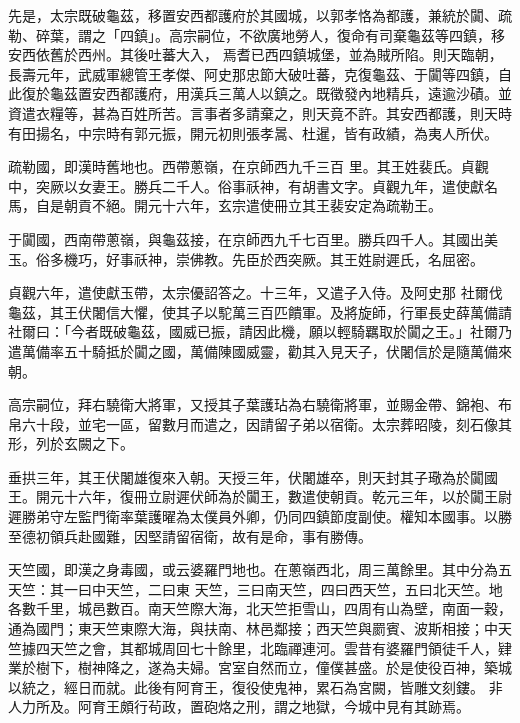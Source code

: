 \begin{pinyinscope}
 先是，太宗既破龜茲，移置安西都護府於其國城，以郭孝恪為都護，兼統於闐、疏勒、碎葉，謂之「四鎮」。高宗嗣位，不欲廣地勞人，復命有司棄龜茲等四鎮，移安西依舊於西州。其後吐蕃大入，
 焉耆已西四鎮城堡，並為賊所陷。則天臨朝，長壽元年，武威軍總管王孝傑、阿史那忠節大破吐蕃，克復龜茲、于闐等四鎮，自此復於龜茲置安西都護府，用漢兵三萬人以鎮之。既徵發內地精兵，遠逾沙磧。並資遣衣糧等，甚為百姓所苦。言事者多請棄之，則天竟不許。其安西都護，則天時有田揚名，中宗時有郭元振，開元初則張孝暠、杜暹，皆有政績，為夷人所伏。



 疏勒國，即漢時舊地也。西帶蔥嶺，在京師西九千三百
 里。其王姓裴氏。貞觀中，突厥以女妻王。勝兵二千人。俗事祅神，有胡書文字。貞觀九年，遣使獻名馬，自是朝貢不絕。開元十六年，玄宗遣使冊立其王裴安定為疏勒王。



 于闐國，西南帶蔥嶺，與龜茲接，在京師西九千七百里。勝兵四千人。其國出美玉。俗多機巧，好事祅神，崇佛教。先臣於西突厥。其王姓尉遲氏，名屈密。



 貞觀六年，遣使獻玉帶，太宗優詔答之。十三年，又遣子入侍。及阿史那
 社爾伐龜茲，其王伏闍信大懼，使其子以駝萬三百匹饋軍。及將旋師，行軍長史薛萬備請社爾曰：「今者既破龜茲，國威已振，請因此機，願以輕騎羈取於闐之王。」社爾乃遣萬備率五十騎抵於闐之國，萬備陳國威靈，勸其入見天子，伏闍信於是隨萬備來朝。



 高宗嗣位，拜右驍衛大將軍，又授其子葉護玷為右驍衛將軍，並賜金帶、錦袍、布帛六十段，並宅一區，留數月而遣之，因請留子弟以宿衛。太宗葬昭陵，刻石像其形，列於玄闕之下。



 垂拱三年，其王伏闍雄復來入朝。天授三年，伏闍雄卒，則天封其子璥為於闐國王。開元十六年，復冊立尉遲伏師為於闐王，數遣使朝貢。乾元三年，以於闐王尉遲勝弟守左監門衛率葉護曜為太僕員外卿，仍同四鎮節度副使。權知本國事。以勝至德初領兵赴國難，因堅請留宿衛，故有是命，事有勝傳。



 天竺國，即漢之身毒國，或云婆羅門地也。在蔥嶺西北，周三萬餘里。其中分為五天竺：其一曰中天竺，二曰東
 天竺，三曰南天竺，四曰西天竺，五曰北天竺。地各數千里，城邑數百。南天竺際大海，北天竺拒雪山，四周有山為壁，南面一穀，通為國門；東天竺東際大海，與扶南、林邑鄰接；西天竺與罽賓、波斯相接；中天竺據四天竺之會，其都城周回七十餘里，北臨禪連河。雲昔有婆羅門領徒千人，肄業於樹下，樹神降之，遂為夫婦。宮室自然而立，僮僕甚盛。於是使役百神，築城以統之，經日而就。此後有阿育王，復役使鬼神，累石為宮闕，皆雕文刻鏤。
 非人力所及。阿育王頗行茍政，置砲烙之刑，謂之地獄，今城中見有其跡焉。




\end{pinyinscope}

